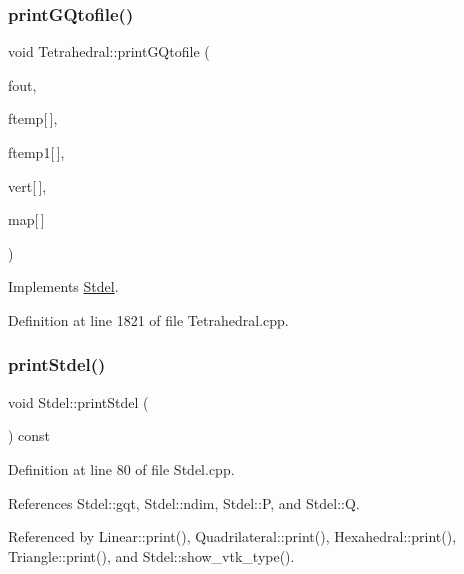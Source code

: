 \subsubsection{\texorpdfstring{print\+G\+Qtofile()}{printGQtofile()}}
{\footnotesize\ttfamily void Tetrahedral\+::print\+G\+Qtofile (\begin{DoxyParamCaption}\item[{F\+I\+LE $\ast$}]{fout,  }\item[{const double}]{ftemp\mbox{[}$\,$\mbox{]},  }\item[{const double}]{ftemp1\mbox{[}$\,$\mbox{]},  }\item[{const \hyperlink{structVertice}{Vertice}}]{vert\mbox{[}$\,$\mbox{]},  }\item[{const int}]{map\mbox{[}$\,$\mbox{]} }\end{DoxyParamCaption})\hspace{0.3cm}{\ttfamily [virtual]}}



Implements \hyperlink{classStdel_a8196ddf2ec3c88627e33d19f93fdb354}{Stdel}.



Definition at line 1821 of file Tetrahedral.\+cpp.

\mbox{\label{classStdel_a54b5768d09f500cb949e66fc234eac70}} 
\subsubsection{\texorpdfstring{print\+Stdel()}{printStdel()}}
{\footnotesize\ttfamily void Stdel\+::print\+Stdel (\begin{DoxyParamCaption}{ }\end{DoxyParamCaption}) const\hspace{0.3cm}{\ttfamily [inherited]}}



Definition at line 80 of file Stdel.\+cpp.



References Stdel\+::gqt, Stdel\+::ndim, Stdel\+::P, and Stdel\+::Q.



Referenced by Linear\+::print(), Quadrilateral\+::print(), Hexahedral\+::print(), Triangle\+::print(), and Stdel\+::show\+\_\+vtk\+\_\+type().

